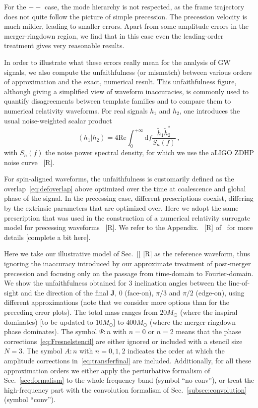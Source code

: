 \documentclass[aps,showpacs,twocolumn,
prd,superscriptaddress,nofootinbib]{revtex4-1}
\newcommand{\be}{\begin{equation}}
\newcommand{\ee}{\end{equation}}
\newcommand\ud{{\mathrm{d}}}
\newcommand{\Msol}{M_{\odot}}
\newcommand{\SM}[1]{{\color{Red} #1}}
\begin{document}
For the $--$ case, the mode hierarchy is not respected, as the frame trajectory does not quite follow the picture of simple precession. The precession velocity is much milder, leading to smaller errors. Apart from some amplitude errors in the merger-ringdown region, we find that in this case even the leading-order treatment gives very reasonable results.

In order to illustrate what these errors really mean for the analysis of GW signals, we also compute the unfaithfulness (or mismatch) between various orders of approximation and the exact, numerical result. This unfaithfulness figure, although giving a simplified view of waveform inaccuracies, is commonly used to quantify disagreements between template families and to compare them to numerical relativity waveforms. For real signals $h_{1}$ and $h_{2}$, one introduces the usual noise-weighted scalar product
\be\label{eq:defoverlap}
	\left( h_{1} | h_{2} \right) = 4\text{Re} \int_{0}^{+\infty} \ud f \frac{\tilde{h}_{1} \tilde{h}_{2}^{*}}{S_{n}(f)} \,,
\ee
with $S_{n}(f)$ the noise power spectral density, for which we use the aLIGO ZDHP noise curve~\cite{} \SM{[R]}.

For spin-aligned waveforms, the unfaithfulness is customarily defined as the overlap~\eqref{eq:defoverlap} above optimized over the time at coalescence and global phase of the signal. In the precessing case, different prescriptions coexist, differing by the extrinsic parameters that are optimized over. Here we adopt the same prescription that was used in the construction of a numerical relativity surrogate model for precessing waveforms~\cite{} \SM{[R]}. We refer to the Appendix.~\SM{[R]} of~\cite{} for more details \SM{[complete a bit here]}.

Here we take our illustrative model of Sec.~\ref{} \SM{[R]} as the reference waveform, thus ignoring the inaccuracy introduced by our approximate treatment of post-merger precession and focusing only on the passage from time-domain to Fourier-domain. We show the unfaithfulness obtained for 3 inclination angles between the line-of-sight and the direction of the final $\bm{J}$, $0$ (face-on), $\pi/3$ and $\pi/2$ (edge-on), using different approximations (note that we consider more options than for the preceding error plots). The total mass ranges from $20\Msol$ (where the inspiral dominates) \SM{[to be updated to $10 \Msol$]} to $400\Msol$ (where the merger-ringdown phase dominates). The symbol $\Psi:n$ with $n=0$ or $n=2$ means that the phase corrections~\eqref{eq:Fresnelstencil} are either ignored or included with a stencil size $N=3$. The symbol $A:n$ with $n=0,1,2$ indicates the order at which the amplitude corrections in~\eqref{eq:transferfinal} are included. Additionally, for all these approximation orders we either apply the perturbative formalism of Sec.~\ref{sec:formalism} to the whole frequency band (symbol ``no conv''), or treat the high-frequency part with the convolution formalism of Sec.~\ref{subsec:convolution} (symbol ``conv''). 
\end{document}
